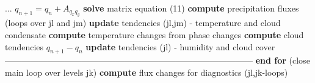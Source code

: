 \documentclass[
a4paper,     %
12pt,        %
article,
onecolumn,   %
openany,     %
]{memoir}
\begin{document}
\begin{algorithm}[H]
\begin{algorithmic}
\Indent
\Indent
\State ...
\State $q_{n+1} = q_{n} + A_{q_{x} q_{y}}$
\vspace{.1cm}
\State \textbf{solve} matrix equation (11) \label{lst:equation11} 
\State \textbf{compute} precipitation fluxes (loops over jl and jm)
\vspace{.2cm}
\State \textbf{update} tendencies (jl,jm) - temperature and cloud condensate
\Indent
\State \textbf{compute} temperature changes from phase changes
\State \textbf{compute} cloud tendencies $q_{n+1} - q_{n}$
\EndIndent
\vspace{.1cm}
\State \textbf{update} tendencies (jl) - humidity and cloud cover
\vspace{-.2cm}
\EndIndent
\State ---------------------------------------------------------------------------------------
\EndIndent
\State \textbf{end for} (close main loop over levels jk)
\State \textbf{compute} flux changes for diagnostics (jl,jk-loops)
\end{algorithmic}
\end{algorithm}
\end{document}
